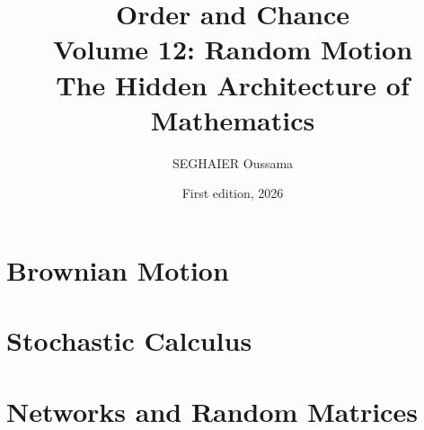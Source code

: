 \documentclass[11pt,openany]{book}
\title{\Huge\textbf{Order and Chance}\\[0.4em]\LARGE Volume 12: Random Motion\\[0.6em]
\Large The Hidden Architecture of Mathematics}
\author{SEGHAIER Oussama}
\date{First edition, 2026}
\begin{document}
\frontmatter
\makecover
\maketitle

\tableofcontents

\mainmatter

\part{Brownian Motion}


\part{Stochastic Calculus}





\part{Networks and Random Matrices}





\appendix


\end{document}
